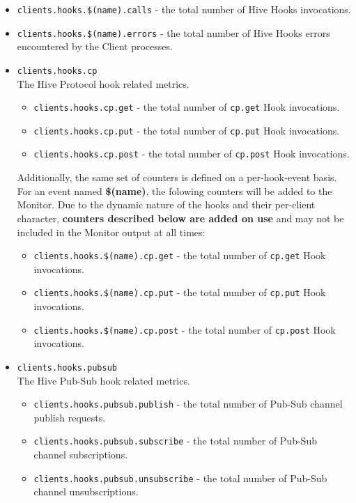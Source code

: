 \documentclass[a4paper]{article}
\begin{document}
\begin{itemize}
\item \texttt{clients.hooks.\$(name).calls} - the total number of Hive Hooks invocations.
\item \texttt{clients.hooks.\$(name).errors} - the total number of Hive Hooks errors encountered by the Client processes.
\end{itemize}
\begin{itemize}

\item \texttt{clients.hooks.cp}\\
\label{sec-4-2-9-1}%
The Hive Protocol hook related metrics.


\begin{itemize}
\item \texttt{clients.hooks.cp.get} - the total number of \texttt{cp.get} Hook invocations.
\item \texttt{clients.hooks.cp.put} - the total number of \texttt{cp.put} Hook invocations.
\item \texttt{clients.hooks.cp.post} - the total number of \texttt{cp.post} Hook invocations.
\end{itemize}

\noindent
Additionally, the same set of counters is defined on a per-hook-event basis. For an event named \textbf{\$(name)}, the folowing counters will be added to the Monitor. Due to the dynamic nature of the hooks and their per-client character, \textbf{counters described below are added on use} and may not be included in the Monitor output at all times:


\begin{itemize}
\item \texttt{clients.hooks.\$(name).cp.get} - the total number of \texttt{cp.get} Hook invocations.
\item \texttt{clients.hooks.\$(name).cp.put} - the total number of \texttt{cp.put} Hook invocations.
\item \texttt{clients.hooks.\$(name).cp.post} - the total number of \texttt{cp.post} Hook invocations.
\end{itemize}


\item \texttt{clients.hooks.pubsub}\\
\label{sec-4-2-9-2}%
The Hive Pub-Sub hook related metrics.


\begin{itemize}
\item \texttt{clients.hooks.pubsub.publish} - the total number of Pub-Sub channel publish requests.
\item \texttt{clients.hooks.pubsub.subscribe} - the total number of Pub-Sub channel subscriptions.
\item \texttt{clients.hooks.pubsub.unsubscribe} - the total number of Pub-Sub channel unsubscriptions.
\end{itemize}


\end{itemize}
\end{document}
